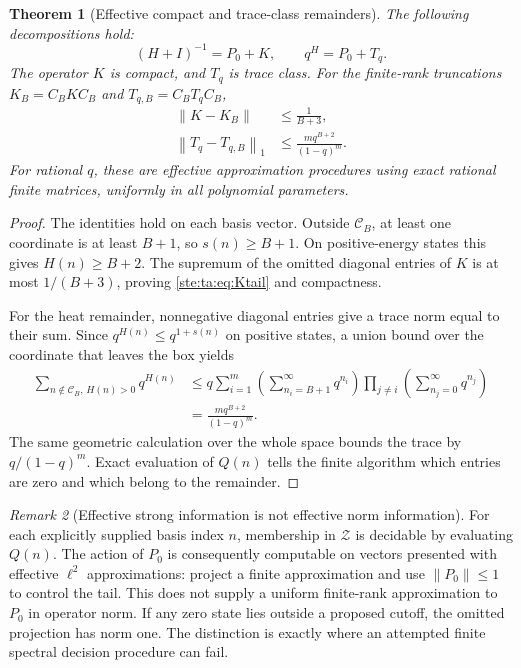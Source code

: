 \documentclass[11pt,letterpaper]{article}
\newtheorem{theorem}{Theorem}[section]
\theoremstyle{definition}
\theoremstyle{remark}
\newtheorem{remark}[theorem]{Remark}
\newcommand{\norm}[1]{\left\lVert #1\right\rVert}
\newcommand{\cB}{\mathcal C_B}
\begin{document}
\begin{theorem}[Effective compact and trace-class remainders]\label{ste:ta:thm:remainders}
The following decompositions hold:
\begin{equation}\label{ste:ta:eq:decomposition}
(H+I)^{-1}=P_0+K,\qquad q^H=P_0+T_q.
\end{equation}
The operator $K$ is compact, and $T_q$ is trace class. For the finite-rank truncations $K_B=C_BKC_B$ and $T_{q,B}=C_BT_qC_B$,
\begin{align}
\norm{K-K_B}&\le\frac1{B+3},\label{ste:ta:eq:Ktail}\\
\norm{T_q-T_{q,B}}_1&\le
\frac{m q^{B+2}}{(1-q)^m}.\label{ste:ta:eq:Ttail}
\end{align}
For rational $q$, these are effective approximation procedures using exact rational finite matrices, uniformly in all polynomial parameters.
\end{theorem}
\begin{proof}
The identities hold on each basis vector. Outside $\cB$, at least one coordinate is at least $B+1$, so $s(n)\ge B+1$. On positive-energy states this gives $H(n)\ge B+2$. The supremum of the omitted diagonal entries of $K$ is at most $1/(B+3)$, proving \eqref{ste:ta:eq:Ktail} and compactness.

For the heat remainder, nonnegative diagonal entries give a trace norm equal to their sum. Since $q^{H(n)}\le q^{1+s(n)}$ on positive states, a union bound over the coordinate that leaves the box yields
\begin{align*}
\sum_{n\notin\cB,\,H(n)>0}q^{H(n)}
&\le q\sum_{i=1}^m\left(\sum_{n_i=B+1}^\infty q^{n_i}\right)
\prod_{j\ne i}\left(\sum_{n_j=0}^\infty q^{n_j}\right)\\
&=\frac{m q^{B+2}}{(1-q)^m}.
\end{align*}
The same geometric calculation over the whole space bounds the trace by $q/(1-q)^m$. Exact evaluation of $Q(n)$ tells the finite algorithm which entries are zero and which belong to the remainder.
\end{proof}

\begin{remark}[Effective strong information is not effective norm information]
For each explicitly supplied basis index $n$, membership in $\mathcal Z$ is decidable by evaluating $Q(n)$. The action of $P_0$ is consequently computable on vectors presented with effective $\ell^2$ approximations: project a finite approximation and use $\norm{P_0}\le1$ to control the tail. This does not supply a uniform finite-rank approximation to $P_0$ in operator norm. If any zero state lies outside a proposed cutoff, the omitted projection has norm one. The distinction is exactly where an attempted finite spectral decision procedure can fail.
\end{remark}
\end{document}
